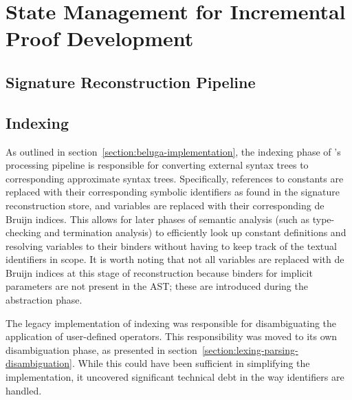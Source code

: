\chapter{State Management for Incremental Proof Development}


\section{Signature Reconstruction Pipeline}


\section{Indexing}\label{section:indexing}


As outlined in section~\ref{section:beluga-implementation}, the indexing phase of \Beluga's processing pipeline is responsible for converting external syntax trees to corresponding approximate syntax trees.
Specifically, references to constants are replaced with their corresponding symbolic identifiers as found in the signature reconstruction store, and variables are replaced with their corresponding de Bruijn indices.
This allows for later phases of semantic analysis (such as type-checking and termination analysis) to efficiently look up constant definitions and resolving variables to their binders without having to keep track of the textual identifiers in scope.
It is worth noting that not all variables are replaced with de Bruijn indices at this stage of reconstruction because binders for implicit parameters are not present in the \ac{AST}; these are introduced during the abstraction phase.



The legacy implementation of indexing was responsible for disambiguating the application of user-defined operators.
This responsibility was moved to its own disambiguation phase, as presented in section~\ref{section:lexing-parsing-disambiguation}.
While this could have been sufficient in simplifying the implementation, it uncovered significant technical debt in the way identifiers are handled.

